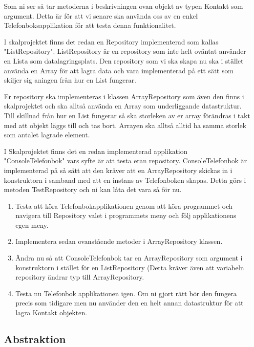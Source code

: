 \documentclass{article}
\begin{document}
  Som ni ser så tar metoderna i beskrivningen ovan objekt av typen Kontakt som argument. Detta är för att vi senare ska använda oss av en enkel Telefonboksapplikation för att testa denna funktionalitet.
  
  I skalprojektet finns det redan en Repository implementerad som kallas "ListRepository". ListRepository är en repository som inte helt oväntat använder en Lista som datalagringsplats. Den repository som vi ska skapa nu ska i stället använda en Array för att lagra data och vara implementerad på ett sätt som skiljer sig aningen från hur en List fungerar.
  
  Er repository ska implementeras i klassen ArrayRepository som även den finns i skalprojektet och ska alltså använda en Array som underliggande datastruktur. Till skillnad från hur en List fungerar så ska storleken av er array förändras i takt med att objekt läggs till och tas bort. Arrayen ska alltså alltid ha samma storlek som antalet lagrade element.

I Skalprojektet finns det en redan implementerad applikation "ConsoleTelefonbok" vars syfte är att testa eran repository. ConsoleTelefonbok är implementerad på så sätt att den kräver att en ArrayRepository skickas in i konstruktorn i samband med att en instans av Telefonboken skapas. Detta görs i metoden TestRepository och ni kan låta det vara så för nu.
    \begin{enumerate}
                 \item Testa att köra Telefonbokapplikationen genom att köra programmet och navigera till Repository valet i programmets meny och följ applikationens egen meny.
    	          \item Implementera sedan ovanstående metoder i ArrayRepository klassen.
    	          \item Ändra nu så att ConsoleTelefonbok tar en ArrayRepository som argument i konstruktorn i stället för en ListRepository (Detta kräver även att variabeln repository ändrar typ till ArrayRepository.
    	          \item Testa nu Telefonbok applikationen igen. Om ni gjort rätt bör den fungera precis som tidigare men nu använder den en helt annan datastruktur för att lagra Kontakt objekten.
    	              
     \end{enumerate}

  \subsection*{Abstraktion}
\end{document}
